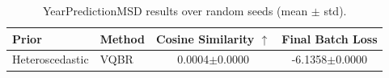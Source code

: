 \begin{table}[t]
\centering
\caption{YearPredictionMSD results over random seeds (mean $\pm$ std).}
\begin{tabular}{llcc}
\toprule
Prior & Method & Cosine Similarity $\uparrow$ & Final Batch Loss \\
\midrule
Heteroscedastic & VQBR & 0.0004$\pm$0.0000 & -6.1358$\pm$0.0000 \\
\bottomrule
\end{tabular}
\end{table}
